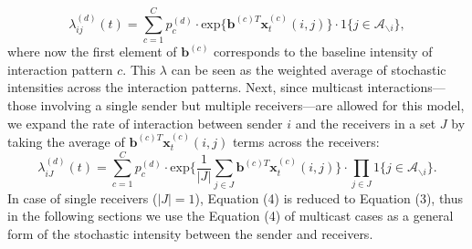 \documentclass[a4paper]{article}
\begin{document}
\begin{equation}
\lambda^{(d)}_{ij}(t)= \sum\limits_{c=1}^{C} p^{(d)}_c\cdot\mbox{exp}\Big\{\boldsymbol{b}^{(c)T}\boldsymbol{x}^{(c)}_t(i, j)\Big\}\cdot 1\{j \in \mathcal{A}_{\backslash i}\},
\end{equation}
where now the first element of $\boldsymbol{b}^{(c)}$ corresponds to the baseline intensity of interaction pattern $c$. This $\lambda$ can be seen as the weighted average of stochastic intensities across the interaction patterns. Next, since multicast interactions—those involving a single sender but multiple
receivers—are allowed for this model, we expand the rate of interaction between sender $i$ and the receivers in a set $J$ by taking the average of $\boldsymbol{b}^{(c)T}\boldsymbol{x}^{(c)}_t(i, j)$ terms across the receivers:
\begin{equation}
\lambda^{(d)}_{iJ}(t)= \sum\limits_{c=1}^{C} p^{(d)}_c\cdot\mbox{exp}\Big\{\frac{1}{|J|}\sum\limits_{j \in J} \boldsymbol{b}^{(c)T}\boldsymbol{x}^{(c)}_t(i, j)\Big\}\cdot \prod\limits_{j \in J}1\{j \in \mathcal{A}_{\backslash i}\}.
\end{equation}
In case of single receivers ($|J|=1$),  Equation (4) is reduced to Equation (3), thus in the following sections we use the Equation (4) of multicast cases as a general form of the stochastic intensity between the sender and receivers.
\end{document}
